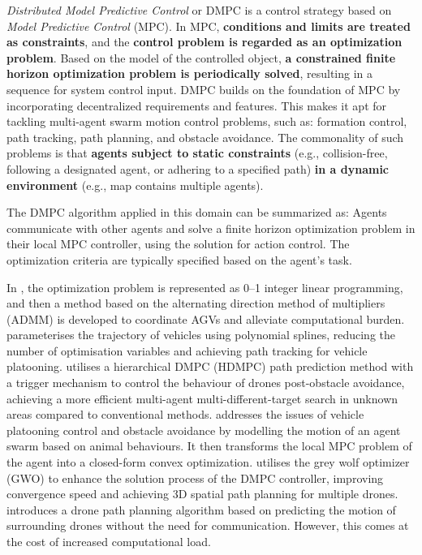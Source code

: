 \textit{Distributed Model Predictive Control} or DMPC is a control strategy based on \textit{Model Predictive Control} (MPC). In MPC, \textbf{conditions and limits are treated as constraints}, and the \textbf{control problem is regarded as an optimization problem}. Based on the model of the controlled object, 
\textbf{a constrained finite horizon optimization problem is periodically solved}, resulting in a sequence for system control input. 
DMPC builds on the foundation of MPC by incorporating decentralized requirements and features. This makes it apt for tackling multi-agent swarm motion control problems, 
such as: formation control\cite{Formation_Control}, path tracking\cite{Path_Tracking}, path planning\cite{Path_Planning}, and obstacle avoidance\cite{Obstacle_Avoid}.
The commonality of such problems is that \textbf{agents subject to static constraints} (e.g., collision-free, following a designated agent, or adhering to a specified path) \textbf{in a dynamic environment} (e.g., map contains multiple agents).

The DMPC algorithm applied in this domain can be summarized as: 
Agents communicate with other agents and solve a finite horizon optimization problem in their local MPC controller, using the solution for action control. 
The optimization criteria are typically specified based on the agent's task. 

In \cite{xin2023model}, the optimization problem is represented as 0–1 integer linear programming, and then a method based on the alternating direction method of multipliers (ADMM) is developed to coordinate AGVs and alleviate computational burden.
\cite{matouvs2022distributed} parameterises the trajectory of vehicles using polynomial splines, reducing the number of optimisation variables and achieving path tracking for vehicle platooning.
\cite{zhao2022distributed} utilises a hierarchical DMPC (HDMPC) path prediction method with a trigger mechanism to control the behaviour of drones post-obstacle avoidance, achieving a more efficient multi-agent multi-different-target search in unknown areas compared to conventional methods.
\cite{mousavi2020distributed}addresses the issues of vehicle platooning control and obstacle avoidance by modelling the motion of an agent swarm based on animal behaviours. It then transforms the local MPC problem of the agent into a closed-form convex optimization.
\cite{yang2022cooperative} utilises the grey wolf optimizer (GWO) to enhance the solution process of the DMPC controller, improving convergence speed and achieving 3D spatial path planning for multiple drones.
\cite{niu2022communication} introduces a drone path planning algorithm based on predicting the motion of surrounding drones without the need for communication. However, this comes at the cost of increased computational load.

